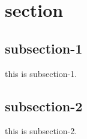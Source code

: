 \documentclass[a4j,twocolumn]{jsarticle}
\begin{document}
 
\twocolumn[\makeHeader]

\section{section}
\subsection{subsection-1}
this is subsection-1.

\subsection{subsection-2}
this is subsection-2.




\begin{thebibliography}{99}

\end{thebibliography} 
\end{document}

